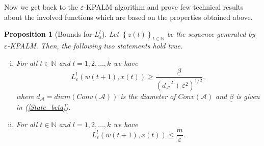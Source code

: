\documentclass[12pt]{article}
\numberwithin{equation}{section}
\newtheorem{proposition}{Proposition}[section]
\begin{document}

Now we get back to the $\varepsilon$-KPALM algorithm and prove few technical results about the involved functions which are based on the properties obtained above.

\begin{proposition}[Bounds for $L^l_{\varepsilon}$] \label{State_L_bounds}
Let $\left\lbrace z(t) \right\rbrace_{t \in \mathbb{N}}$ be the sequence generated by $\varepsilon$-KPALM. Then, the following two statements hold true.
\begin{enumerate}[(i)]
	\item For all $t \in \mathbb{N}$ and $l=1,2, \ldots, k$ we have
	\begin{equation*}
		L^l_{\varepsilon}(w(t+1),x(t)) \geq \frac{\underline{\beta}}{\left( {d_{\mathcal{A}}}^2 + {\varepsilon}^2 \right)^{1/2}} ,
	\end{equation*}
	where $d_{\mathcal{A}} = diam(Conv(\mathcal{A}))$ is the diameter of $Conv(\mathcal{A})$ and $\underline{\beta}$ is given in (\ref{State_beta}). \label{State_L_bounds1}
	\item For all $t \in \mathbb{N}$ and $l=1,2, \ldots, k$ we have
	\begin{equation*}
		L^l_{\varepsilon}(w(t+1),x(t)) \leq \frac{m}{\varepsilon} .
	\end{equation*} \label{State_L_bounds2}
\end{enumerate}
\end{proposition}
\end{document}
